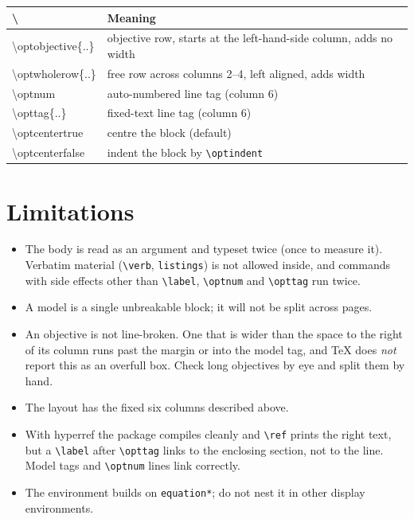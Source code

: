 \documentclass[a4paper,11pt]{article}
\newcommand\cs[1]{\texttt{\textbackslash #1}}
\newcommand\pkg[1]{\textsf{#1}}
\begin{document}
\begin{center}\small
\begin{tabular}{@{}>{\ttfamily\textbackslash}l >{\raggedright\arraybackslash}p{}@{}}
\toprule
\multicolumn{1}{@{}l}{Command} & Meaning\\
\midrule
optobjective\{..\} & objective row, starts at the left-hand-side column, adds no width\\
optwholerow\{..\}  & free row across columns 2--4, left aligned, adds width\\
optnum             & auto-numbered line tag (column 6)\\
opttag\{..\}       & fixed-text line tag (column 6)\\
optcentertrue      & centre the block (default)\\
optcenterfalse     & indent the block by \cs{optindent}\\
\bottomrule
\end{tabular}
\end{center}

\section{Limitations}

\begin{itemize}
\item The body is read as an argument and typeset twice (once to measure it).
  Verbatim material (\cs{verb}, \texttt{listings}) is not allowed inside, and
  commands with side effects other than \cs{label}, \cs{optnum} and \cs{opttag}
  run twice.
\item A model is a single unbreakable block; it will not be split across pages.
\item An objective is not line-broken. One that is wider than the space to the
  right of its column runs past the margin or into the model tag, and \TeX{}
  does \emph{not} report this as an overfull box. Check long objectives by eye
  and split them by hand.
\item The layout has the fixed six columns described above.
\item With \pkg{hyperref} the package compiles cleanly and \cs{ref} prints the
  right text, but a \cs{label} after \cs{opttag} links to the enclosing
  section, not to the line. Model tags and \cs{optnum} lines link correctly.
\item The environment builds on \texttt{equation*}; do not nest it in other
  display environments.
\end{itemize}
\end{document}
